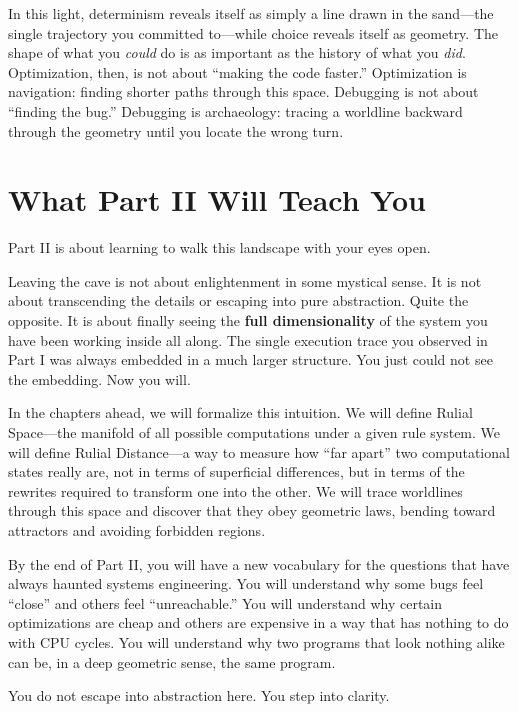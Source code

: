In this light, determinism reveals itself as simply a line drawn in the sand---the single trajectory you committed to---while choice reveals itself as geometry. The shape of what you \emph{could} do is as important as the history of what you \emph{did}. Optimization, then, is not about ``making the code faster.'' Optimization is navigation: finding shorter paths through this space. Debugging is not about ``finding the bug.'' Debugging is archaeology: tracing a worldline backward through the geometry until you locate the wrong turn.

\section*{What Part II Will Teach You}

Part II is about learning to walk this landscape with your eyes open.

Leaving the cave is not about enlightenment in some mystical sense. It is not about transcending the details or escaping into pure abstraction. Quite the opposite. It is about finally seeing the \textbf{full dimensionality} of the system you have been working inside all along. The single execution trace you observed in Part I was always embedded in a much larger structure. You just could not see the embedding. Now you will.

In the chapters ahead, we will formalize this intuition. We will define Rulial Space---the manifold of all possible computations under a given rule system. We will define Rulial Distance---a way to measure how ``far apart'' two computational states really are, not in terms of superficial differences, but in terms of the rewrites required to transform one into the other. We will trace worldlines through this space and discover that they obey geometric laws, bending toward attractors and avoiding forbidden regions.

By the end of Part II, you will have a new vocabulary for the questions that have always haunted systems engineering. You will understand why some bugs feel ``close'' and others feel ``unreachable.'' You will understand why certain optimizations are cheap and others are expensive in a way that has nothing to do with CPU cycles. You will understand why two programs that look nothing alike can be, in a deep geometric sense, the same program.

You do not escape into abstraction here. You step into clarity.